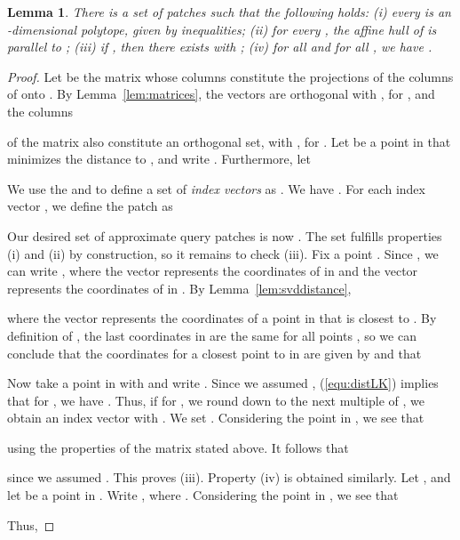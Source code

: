 \documentclass[a4paper,11pt]{paper}
\newtheorem{lemma}[theorem]{Lemma}
\begin{document}
\begin{lemma}\label{lem:patches}
  There is a set   of 
  patches such
  that the following holds:
  (i) every  is an -dimensional
    polytope, given by  inequalities;
  (ii) for every ,
  the affine hull of  is parallel to ;
  (iii) if ,
  then there exists  with
  ;
  (iv) for all  and for all , we have
  .
\end{lemma}
\begin{proof}
Let  be the  matrix
whose columns  constitute
the projections of the columns of  onto .
By Lemma~\ref{lem:matrices},
the vectors  are  orthogonal with
, for
, and the columns

of the matrix  also constitute an orthogonal set,
with ,
for . Let 
be a point in  that minimizes the distance to , and write
.  Furthermore, let

We use the  and  to define a set  of
\emph{index vectors} as
.
We have .
For each index vector , we define the patch  as

Our desired set of approximate query patches is now
.
The set  fulfills
properties (i) and (ii) by construction, so it remains to check
(iii). Fix a point . Since , we can
write , where the vector 
represents the coordinates of  in  and the vector 
represents the coordinates of  in .
By Lemma~\ref{lem:svddistance},

where the vector  represents the coordinates of a point in
 that is closest to . By definition of , the last
 coordinates  in   are the same for all points
, so we can conclude that the coordinates for
a closest point to  in  are given by
 and that

Now take a point  in  with  and
write .
Since we assumed , (\ref{equ:distLK})
implies that for , we have
.
Thus, if for , we round
 down to the next multiple of
,
we obtain an index vector  with
.
We set . Considering the point
 in  , we see that

using the properties of the matrix  stated above.
It follows that

since we  assumed . This proves
(iii). Property (iv) is obtained similarly.
Let ,  and let
 be a point in . Write ,
where .
Considering the point  in ,
we see that

Thus,

\end{proof}
\end{document}
